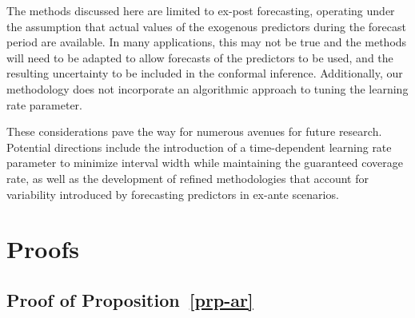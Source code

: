 \documentclass[
  11pt,
  12pt]{article}
\theoremstyle{plain}
\theoremstyle{remark}
\begin{document}
The methods discussed here are limited to ex-post forecasting, operating
under the assumption that actual values of the exogenous predictors
during the forecast period are available. In many applications, this may
not be true and the methods will need to be adapted to allow forecasts
of the predictors to be used, and the resulting uncertainty to be
included in the conformal inference. Additionally, our methodology does
not incorporate an algorithmic approach to tuning the learning rate
parameter.

These considerations pave the way for numerous avenues for future
research. Potential directions include the introduction of a
time-dependent learning rate parameter to minimize interval width while
maintaining the guaranteed coverage rate, as well as the development of
refined methodologies that account for variability introduced by
forecasting predictors in ex-ante scenarios.

\appendix
\setcounter{section}{0}
\renewcommand{\thesection}{Appendix \Alph{section}}
\renewcommand{\thesubsection}{\Alph{section}.\arabic{subsection}}

\section{Proofs}\label{sec-proof}

\subsection{\texorpdfstring{Proof of
Proposition~\ref{prp-ar}}{Proof of Proposition~}}\label{sec-proof_ar}
\end{document}
